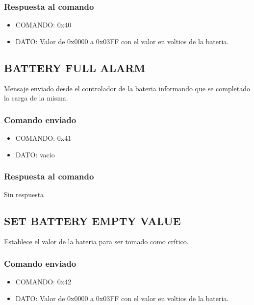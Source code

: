 \documentclass[a4paper,10pt]{article}
\begin{document}
\subsubsection*{Respuesta al comando}

\begin{itemize}
	\item{COMANDO:} 0x40
	\item{DATO:} Valor de 0x0000 a 0x03FF con el valor en voltios de la bateria.
\end{itemize}

\subsection{BATTERY FULL ALARM}
\label{battery_full_alarm}

Mensaje enviado desde el controlador de la bateria informando que se completado la carga de la misma.

\subsubsection*{Comando enviado}

\begin{itemize}
	\item{COMANDO:} 0x41
	\item{DATO:} vacio
\end{itemize}

\subsubsection*{Respuesta al comando}

Sin respuesta

\subsection{SET BATTERY EMPTY VALUE}
\label{set_battery_empty_value}

Establece el valor de la bateria para ser tomado como cr\'itico.

\subsubsection*{Comando enviado}

\begin{itemize}
	\item{COMANDO:} 0x42
	\item{DATO:} Valor de 0x0000 a 0x03FF con el valor en voltios de la bateria.
\end{itemize}
\end{document}

